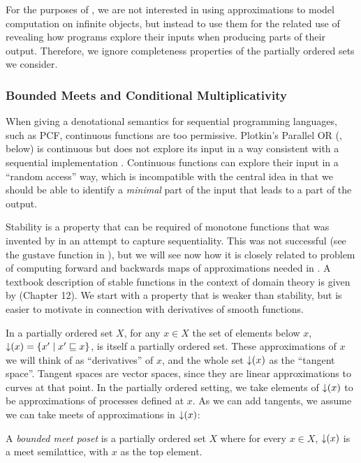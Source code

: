 For the purposes of \GPS, we are not interested in using approximations to model computation on infinite objects, but instead to use them for the related use of revealing how programs explore their inputs when producing parts of their output. Therefore, we ignore completeness properties of the partially ordered sets we consider.

\subsubsection{Bounded Meets and Conditional Multiplicativity}
\label{sec:bounded-meets-and-cm}

When giving a denotational semantics for sequential programming languages, such as PCF, continuous functions are too permissive. Plotkin's Parallel OR (, below) is continuous but does not explore its input in a way consistent with a sequential implementation \cite{plotkin77lcf}. Continuous functions can explore their input in a ``random access'' way, which is incompatible with the central idea in \GPS that we should be able to identify a \emph{minimal} part of the input that leads to a part of the output.

Stability is a property that can be required of monotone functions that was invented by \citet{berry79} in an attempt to capture sequentiality. This was not successful (see the $\mathrm{gustave}$ function in ), but we will see now how it is closely related to problem of computing forward and backwards maps of approximations needed in \GPS. A textbook description of stable functions in the context of domain theory is given by \citet{amadio-curien} (Chapter 12). We start with a property that is weaker than stability, but is easier to motivate in connection with derivatives of smooth functions.

In a partially ordered set $X$, for any $x \in X$ the set of elements below $x$, $\mathop{\downarrow}(x) = \{ x' \mid x' \sqsubseteq x \}$, is itself a partially ordered set. These approximations of $x$ we will think of as ``derivatives'' of $x$, and the whole set $\mathop{\downarrow}(x)$ as the ``tangent space''. Tangent spaces are vector spaces, since they are linear approximations to curves at that point. In the partially ordered setting, we take elements of $\mathop{\downarrow}(x)$ to be approximations of processes defined at $x$. As we can add tangents, we assume we can take meets of approximations in $\mathop{\downarrow}(x)$:

\begin{definition}
  A \emph{bounded meet poset} is a partially ordered set $X$ where for every $x \in X$, $\mathop{\downarrow}(x)$ is a meet semilattice, with $x$ as the top element.
\end{definition}


